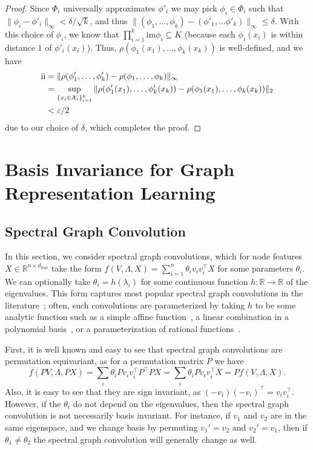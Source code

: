 \documentclass{article} \usepackage{iclr2023_conference,times}
\newcommand{\RR}{\mathbb R}
\newcommand{\mc}[1]{\mathcal{#1}}
\newcommand{\mrm}[1]{\mathrm{#1}}
\newcommand{\RN}[1]{\textup{\uppercase\expandafter{\romannumeral#1}}}
\newcommand{\dfeat}{d_{\mrm{feat}}}
\begin{document}
\begin{proof}
Since $\Phi_i$ universally approximates $\phi'_i$  we may pick $\phi_i \in \Phi_i$ such that $\| \phi_i - \phi'_i \|_\infty < \delta/\sqrt{k}$, and thus $\| (\phi_1, \ldots , \phi_k) - (\phi'_1, \ldots \phi'_k) \|_\infty \leq \delta$. With this choice of $\phi_i$, we know that $\prod_{i=1}^k \mrm{im} \phi_i \subseteq K$ (because each $\phi_i(x_i)$ is within distance $1$ of $\phi'_i(x_i)$). Thus, $\rho(\phi_1(x_1), \ldots, \phi_k(x_k))$ is well-defined, and we have
\begin{align*}
   \RN{2} & = \|  \rho( \phi'_1, \ldots,  \phi'_k ) - \rho( \phi_1, \ldots,  \phi_k ) \|_\infty\\
   & = \sup_{\{x_i \in \mc X_i\}_{i=1}^k} \|  \rho( \phi'_1(x_1), \ldots,  \phi'_k(x_k) ) - \rho( \phi_1(x_1), \ldots,  \phi_k(x_k) ) \|_2\\
   & < \varepsilon / 2
\end{align*}
due to our choice of $\delta$, which completes the proof.
 \end{proof}


\section{Basis Invariance for Graph Representation Learning}



\subsection{Spectral Graph Convolution}\label{appendix:spectral_conv}

In this section, we consider spectral graph convolutions, which for node features $X \in \RR^{n \times \dfeat}$ take the form $f(V, \Lambda, X) = \sum_{i=1}^n \theta_i v_i v_i^\top X$ for some parameters $\theta_i$. We can optionally take $\theta_i = h(\lambda_i)$ for some continuous function $h: \RR \to \RR$ of the eigenvalues. This form captures most popular spectral graph convolutions in the literature~\citep{bruna2014spectral, hamilton2020graph, bronstein2017geometric}; often, such convolutions are parameterized by taking $h$ to be some analytic function such as a simple affine function~\citep{kipf2016semi}, a linear combination in a polynomial basis~\citep{defferrard2016convolutional, chien2021adaptive}, or a parameterization of rational functions~\citep{levie2018cayleynets, bianchi2021graph}.

First, it is well known and easy to see that spectral graph convolutions are permutation equivariant, as for a permutation matrix $P$ we have 
\begin{equation}
f(PV, \Lambda, PX) = \sum_i \theta_i P v_i v_i^\top P^\top P X = \sum_i \theta_i P v_i v_i^\top X = Pf(V, \Lambda, X).
\end{equation}
Also, it is easy to see that they are sign invariant, as $(-v_i)(-v_i)^\top = v_i v_i^\top$. However, if the $\theta_i$ do not depend on the eigenvalues, then the spectral graph convolution is not necessarily basis invariant. For instance, if $v_1$ and $v_2$ are in the same eigenspace, and we change basis by permuting $v_1' = v_2$ and $v_2' = v_1$, then if $\theta_1 \neq \theta_2$ the spectral graph convolution will generally change as well.
\end{document}
